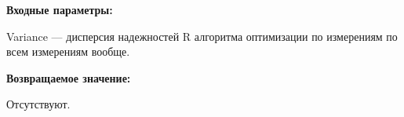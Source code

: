 \textbf{Входные параметры:}

Variance --- дисперсия надежностей R алгоритма оптимизации по измерениям по всем измерениям вообще.

\textbf{Возвращаемое значение:}

Отсутствуют.